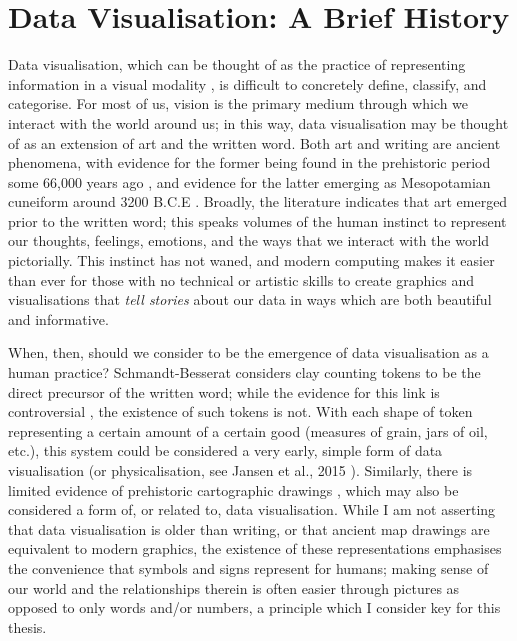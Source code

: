 \documentclass[../main.tex]{subfiles}
\begin{document}
\section{Data Visualisation: A Brief History}\label{brief-history}

Data visualisation, which can be thought of as the practice of
representing information in a visual modality \cite{hinterberger_2009},
is difficult to concretely define, classify, and categorise. For most of
us, vision is the primary medium through which we interact with the
world around us; in this way, data visualisation may be thought of as an
extension of art and the written word. Both art and writing are ancient
phenomena, with evidence for the former being found in the prehistoric
period some 66,000 years ago \cite{standish_2025}, and evidence for the
latter emerging as Mesopotamian cuneiform around 3200 B.C.E
\cite{schmandt_2014}. Broadly, the literature indicates that art emerged
prior to the written word; this speaks volumes of the human instinct to
represent our thoughts, feelings, emotions, and the ways that we
interact with the world pictorially. This instinct has not waned, and
modern computing makes it easier than ever for those with no technical
or artistic skills to create graphics and visualisations that \emph{tell
stories} about our data in ways which are both beautiful and
informative.

When, then, should we consider to be the emergence of data visualisation
as a human practice? Schmandt-Besserat
\cite{schmandt_1978, schmandt_2014} considers clay counting tokens to be
the direct precursor of the written word; while the evidence for this
link is controversial \cite{robson_2007}, the existence of such tokens
is not. With each shape of token representing a certain amount of a
certain good (measures of grain, jars of oil, etc.), this system could
be considered a very early, simple form of data visualisation (or
physicalisation, see Jansen et al., 2015 \cite{jansen_2015}). Similarly,
there is limited evidence of prehistoric cartographic drawings
\cite{muhly_1978}, which may also be considered a form of, or related
to, data visualisation. While I am not asserting that data visualisation
is older than writing, or that ancient map drawings are equivalent to
modern graphics, the existence of these representations emphasises the
convenience that symbols and signs represent for humans; making sense of
our world and the relationships therein is often easier through pictures
as opposed to only words and/or numbers, a principle which I consider
key for this thesis.
\end{document}
